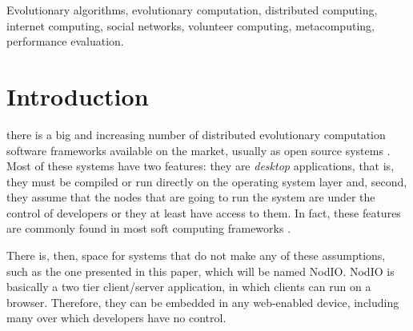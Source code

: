 \documentclass[journal,onecolumn]{IEEEtran}
\begin{document}



\begin{IEEEkeywords}
Evolutionary algorithms, evolutionary computation, distributed computing, internet computing,
social networks, volunteer computing, metacomputing, performance evaluation.
\end{IEEEkeywords}

\section{Introduction}

 there is a big and increasing number of
distributed evolutionary computation software frameworks available on
the market, usually as open source systems \cite{Parejo12Survey}. Most of these systems have 
two features: they are {\em desktop} applications, that is, they must
be compiled or run directly on the operating system layer and, second,
they assume that the nodes that are going to run the system are under
the control of developers or they at least have access to them. In
fact, these features are commonly found in most soft computing
frameworks \cite{7094263}. 

There is, then, space for systems that do not make any of these
assumptions, such as the one presented in this paper, which will be
 named {\sf NodIO}. {\sf NodIO} is basically
a two tier client/server 
application, in which clients can run on a browser. 
Therefore, they can be embedded in any web-enabled device, including many over which 
developers have no control.
\end{document}
